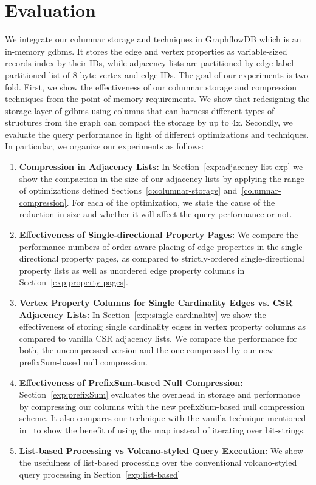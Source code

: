\chapter{Evaluation}
\label{c:evaluation}

We integrate our columnar storage and techniques in GraphflowDB which is an in-memory \gls{gdbms}. It stores the edge and vertex properties as variable-sized records index by their IDs, while adjacency lists are partitioned by edge label-partitioned list of 8-byte vertex and edge IDs. The goal of our experiments is two-fold. First, we show the effectiveness of our columnar storage and compression techniques from the point of memory requirements. We show that redesigning the storage layer of \gls{gdbms} using columns that can harness different types of structures from the graph can compact the storage by up to 4x. Secondly, we evaluate the query performance in light of different optimizations and techniques. In particular, we organize our experiments as follows:

\begin{enumerate}
	\item \textbf{Compression in Adjacency Lists:}  In Section~\ref{exp:adjacency-list-exp} we show the compaction in the size of our adjacency lists by applying the range of optimizations defined Sections~\ref{c:columnar-storage} and~\ref{columnar-compression}. For each of the optimization, we state the cause of the reduction in size and whether it will affect the query performance or not.
	
	\item \textbf{Effectiveness of Single-directional Property Pages:} We compare the performance numbers of order-aware placing of edge properties in the single-directional property pages, as compared to strictly-ordered single-directional property lists as well as unordered edge property columns in Section~\ref{exp:property-pages}.
	
	\item \textbf{Vertex Property Columns for Single Cardinality Edges vs. CSR Adjacency Lists:}  In Section~\ref{exp:single-cardinality} we show the effectiveness of storing single cardinality edges in vertex property columns as compared to vanilla CSR adjacency lists. We compare the performance for both, the uncompressed version and the one compressed by our new prefixSum-based null compression.
	
	\item \textbf{Effectiveness of PrefixSum-based Null Compression:}  Section~\ref{exp:prefixSum} evaluates the overhead in storage and performance by compressing our columns with the new prefixSum-based null compression scheme. It also compares our technique with the vanilla technique mentioned in~\cite{abadi-sparse-col} to show the benefit of using the map instead of iterating over bit-strings.
	
	\item \textbf{List-based Processing vs Volcano-styled Query Execution:} We show the usefulness of list-based processing over the conventional volcano-styled query processing in Section~\ref{exp:list-based}
	
\end{enumerate}

